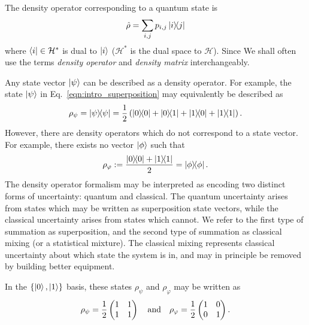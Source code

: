 
The density operator corresponding to a quantum state is
\begin{equation}
\hat{\rho} = \sum_{i, j} p_{i, j} \dyad{i}{j}
\end{equation}
where $\bra{i} \in \mathcal{H}^*$ is dual to $\ket{i}$ ($\mathcal{H}^*$ is the dual space to $\mathcal{H}$). %
Since We shall often use the terms \emph{density operator} and \emph{density matrix} interchangeably.

Any state vector $\ket{\psi}$ can be described as a density operator. For example, the state $\ket{\psi}$ in Eq.~\ref{eqn:intro_superposition} may equivalently be described as 
\begin{equation}
\rho_\psi = \dyad{\psi}{\psi} = \frac{1}{2} \left(\dyad{0}{0} + \dyad{0}{1} + \dyad{1}{0} + \dyad{1}{1} \right).
\end{equation}
However, there are density operators which do not correspond to a state vector. For example, there exists no vector $\ket{\phi}$ such that
\begin{equation}\label{eqn:intro_mixture}
\rho_{\varphi} := \frac{\dyad{0}{0} + \dyad{1}{1}}{2} = \dyad{\phi}.
\end{equation}
The density operator formalism may be interpreted as encoding two distinct forms of uncertainty: quantum and classical. The quantum uncertainty arises from states which may be written as superposition state vectors, while the classical uncertainty arises from states which cannot. We refer to the first type of summation as superposition, and the second type of summation as classical mixing (or a statistical mixture). The classical mixing represents classical uncertainty about which state the system is in, and may in principle be removed by building better equipment.

In the $\left\{\ket{0}, \ket{1}\right\}$ basis, these states $\rho_\psi$ and $\rho_\varphi$ may be written as
\begin{equation}
\rho_\psi = \frac{1}{2}\pmqty{1 & 1 \\ 1 & 1} \qq{and} \rho_\varphi = \frac{1}{2}\pmqty{1 & 0 \\ 0  & 1}.
\end{equation}

